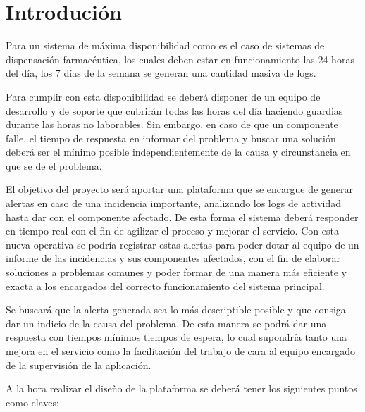 \chapter{Introdución}

Para un sistema de máxima disponibilidad como es el caso de sistemas de dispensación farmacéutica,
los cuales deben estar en funcionamiento las 24 horas del día, los 7 días de la semana se generan una
cantidad masiva de logs.

Para cumplir con esta disponibilidad se deberá disponer de un equipo de desarrollo y de soporte que cubrirán todas las horas del día haciendo guardias durante las horas no laborables. Sin embargo, en caso de que un componente falle, el tiempo de respuesta en informar del problema y buscar una solución deberá ser el mínimo posible independientemente de la causa y circunstancia en que se de el problema.

El objetivo del proyecto será aportar una plataforma que se encargue de generar alertas en caso de
una incidencia importante, analizando los logs de actividad hasta dar con el componente afectado. De esta forma el sistema deberá responder en tiempo real con el fin de agilizar el proceso y mejorar el servicio. Con esta nueva operativa se podría registrar estas alertas para poder dotar al equipo de un informe de las incidencias y sus componentes afectados, con el fin de elaborar soluciones a problemas comunes y poder formar de una manera más eficiente y exacta a los encargados del correcto funcionamiento del sistema principal.

Se buscará que la alerta generada sea lo más descriptible posible y que consiga dar un indicio de la causa
del problema. De esta manera se podrá dar una respuesta con tiempos mínimos tiempos de espera, lo
cual supondría tanto una mejora en el servicio como la facilitación del trabajo de cara al equipo
encargado de la supervisión de la aplicación.

A la hora realizar el diseño de la plataforma se deberá tener los siguientes puntos como claves: 


